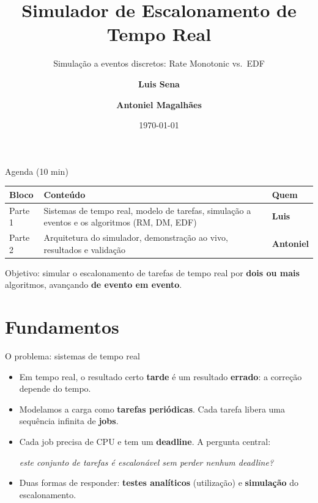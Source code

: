 \documentclass[aspectratio=169,xcolor=table]{beamer}
\author[Luis \& Antoniel]{\textbf{Luis Sena} \and \textbf{Antoniel Magalhães}}
\title{Simulador de Escalonamento de Tempo Real}
\subtitle{Simulação a eventos discretos: Rate Monotonic vs.\ EDF}
\institute{Universidade Federal da Bahia \\ Instituto de Computação \\ Sistemas de Tempo Real}
\date{\today}
\begin{document}
\begin{frame}
    \titlepage
\end{frame}

\begin{frame}{Agenda (10 min)}
    \begin{table}
        \begin{tabularx}{\textwidth}{|l|X|l|}
            \hline
            \textbf{Bloco} & \textbf{Conteúdo} & \textbf{Quem} \\
            \hline
            Parte 1 & Sistemas de tempo real, modelo de tarefas, simulação a eventos e os algoritmos (RM, DM, EDF) & \textbf{Luis} \\
            \hline
            Parte 2 & Arquitetura do simulador, demonstração ao vivo, resultados e validação & \textbf{Antoniel} \\
            \hline
        \end{tabularx}
    \end{table}
    \begin{center}
        \small Objetivo: simular o escalonamento de tarefas de tempo real por
        \textbf{dois ou mais} algoritmos, avançando \textbf{de evento em evento}.
    \end{center}
\end{frame}

\section{Fundamentos}
\begin{frame}{O problema: sistemas de tempo real}
    \begin{itemize}
        \item Em tempo real, o resultado certo \textbf{tarde} é um resultado \textbf{errado}: a correção depende do tempo.
        \item Modelamos a carga como \textbf{tarefas periódicas}. Cada tarefa libera uma sequência infinita de \textbf{jobs}.
        \item Cada job precisa de CPU e tem um \textbf{deadline}. A pergunta central:
        \begin{center}
            \emph{este conjunto de tarefas é escalonável sem perder nenhum deadline?}
        \end{center}
        \item Duas formas de responder: \textbf{testes analíticos} (utilização) e \textbf{simulação} do escalonamento.
    \end{itemize}
\end{frame}
\end{document}
